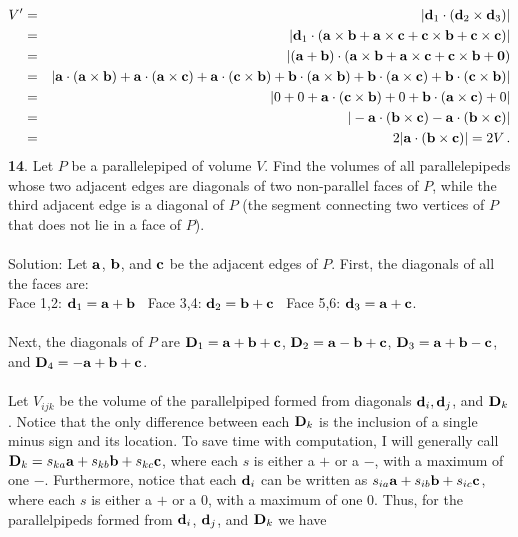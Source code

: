 \documentclass[12pt]{amsbook}
\begin{document}
\begin{eqnarray*}
V'&=&|{\bf d}_1\cdot({\bf d}_2\times{\bf d}_3)|\\
&=&
|{\bf d}_1\cdot({\bf a}\times{\bf b}+{\bf a}\times{\bf c}+ 
{\bf c}\times{\bf b}+{\bf c}\times{\bf c})|\\
&=&|({\bf a}+{\bf b})\cdot({\bf a}\times{\bf b}+{\bf a}\times{\bf c}+ 
{\bf c}\times{\bf b}+{\bf 0})\\
&=&|{\bf a}\cdot({\bf a}\times{\bf b})+{\bf a}\cdot({\bf a}\times{\bf c})
+{\bf a}\cdot({\bf c}\times{\bf b})
+{\bf b}\cdot({\bf a}\times{\bf b})+{\bf b}\cdot({\bf a}\times{\bf c})
+{\bf b}\cdot({\bf c}\times{\bf b})|\\
&=&|0+0+{\bf a}\cdot({\bf c}\times{\bf b})+0+
{\bf b}\cdot({\bf a}\times{\bf c})+0|\\
&=&|-{\bf a}\cdot({\bf b}\times{\bf c})-{\bf a}
\cdot({\bf b}\times{\bf c})|\\
&=& 2|{\bf a}\cdot({\bf b}\times{\bf c})|=2V\,.
\end{eqnarray*}
{\small\bf 14}. Let $P$ be a parallelepiped of volume $V$. Find
the volumes of all parallelepipeds whose two 
adjacent edges are diagonals of two non-parallel faces
of $P$, while the third
adjacent edge is a diagonal of $P$ (the segment connecting two
vertices of $P$ that does not lie in a face of $P$).\\
\\
{\sc Solution}: Let ${\bf a}$, ${\bf b}$, and ${\bf c}$ be the adjacent edges of $P$. 
First, the diagonals of all the faces are:
\\
Face 1,2: ${\bf d}_1={\bf a}+{\bf b}$ \ Face 3,4: ${\bf d}_2={\bf b}+{\bf c}$ \ Face 5,6: ${\bf d}_3={\bf a}+{\bf c}$. \\
\\
Next, the diagonals of $P$ are ${\bf D}_1={\bf a}+{\bf b}+{\bf c}$, ${\bf D}_2={\bf a}-{\bf b}+{\bf c}$, ${\bf D}_3={\bf a}+{\bf b}-{\bf c}$, and ${\bf D}_4=-{\bf a}+{\bf b}+{\bf c}$.
\\
\\
Let $V_{ijk}$ be the volume of the parallelpiped formed from diagonals ${\bf d}_i, {\bf d}_j$, and ${\bf D}_k$. Notice that the only difference between each ${\bf D}_k$ is the inclusion of a single minus sign and its location. To save time with computation, I will generally call ${\bf D}_k=s_{ka}{\bf a}+s_{kb}{\bf b}+s_{kc}{\bf c}$, where each $s$ is either a $+$ or a $-$, with a maximum of one $-$. Furthermore, notice that each ${\bf d}_i$ can be written as $s_{ia}{\bf a}+s_{ib}{\bf b}+s_{ic}{\bf c}$, where each $s$ is either a $+$ or a $0$, with a maximum of one $0$. Thus, for the parallelpipeds formed from ${\bf d}_i$, ${\bf d}_j$, and ${\bf D}_k$ we have
\end{document}
